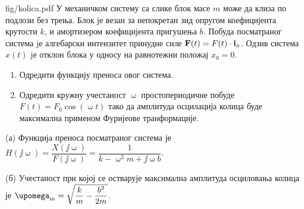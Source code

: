 \begin{slikaDesno}{fig/kolica.pdf}
    \PID
    У механичком систему са слике блок масе $m$ може да клиза по подлози 
    без трења.
    Блок је везан за непокретан зид опругом коефицијента крутости $k$, и амортизером 
    коефицијента пригушења $b$. Побуда посматраног система jе алгебарски
    интензитет принудне силе 
    ${\bf F} (t) = F(t) \cdot {\bf i}_x$. Одзив система $x(t)$ jе отклон блока 
    у односу на равнотежни положај $x_0 = 0$.
\end{slikaDesno}

\begin{enumerate}[label=(\alph*)]
    \item Одредити  функцију
    преноса овог система. 
    \item Одредити кружну учестаност $\upomega$ простопериодичне побуде
    $F(t) = F_0 \cos(\upomega t)$ тако да амплитуда осцилација колица буде максимална
    применом Фуријеове транформације.
\end{enumerate}

\REZULTAT
(а) Функција преноса посматраног система је 
$H(\jj\upomega) = \dfrac{X(\jj\upomega)}{F(\jj\upomega)} = 
\dfrac{1}{k - \upomega^2 m + \jj\upomega b}$.

(б) Учестаност при којој се остварује максимална амплитуда осциловања колица је
$\upomega_{\rm m} = 
\sqrt{
    \dfrac{k}{m}
    -
    \dfrac{b^2}{2m}
}$.